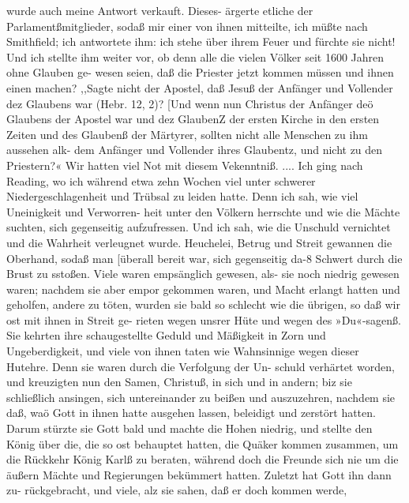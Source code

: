 wurde auch meine Antwort verkauft. Dieses- ärgerte etliche der
Parlamentßmitglieder, sodaß mir einer von ihnen mitteilte, ich
müßte nach Smithfield; ich antwortete ihm: ich stehe über ihrem
Feuer und fürchte sie nicht! Und ich stellte ihm weiter vor, ob
denn alle die vielen Völker seit 1600 Jahren ohne Glauben ge-
wesen seien, daß die Priester jetzt kommen müssen und ihnen einen
machen? ,,Sagte nicht der Apostel, daß Jesuß der Anfänger und
Vollender dez Glaubens war (Hebr. 12, 2)? [Und wenn nun
Christus der Anfänger deö Glaubens der Apostel war und dez
GlaubenZ der ersten Kirche in den ersten Zeiten und des Glaubenß
der Märtyrer, sollten nicht alle Menschen zu ihm aussehen alk-
dem Anfänger und Vollender ihres Glaubentz, und nicht zu den
Priestern?« Wir hatten viel Not mit diesem Vekenntniß. ....
Ich ging nach Reading, wo ich während etwa zehn Wochen
viel unter schwerer Niedergeschlagenheit und Trübsal zu leiden
hatte. Denn ich sah, wie viel Uneinigkeit und Verworren-
heit unter den Völkern herrschte und wie die Mächte suchten, sich
gegenseitig aufzufressen. Und ich sah, wie die Unschuld vernichtet
und die Wahrheit verleugnet wurde. Heuchelei, Betrug und
Streit gewannen die Oberhand, sodaß man [überall bereit war,
sich gegenseitig da-8 Schwert durch die Brust zu sstoßen. Viele
waren empsänglich gewesen, als- sie noch niedrig gewesen waren;
nachdem sie aber empor gekommen waren, und Macht erlangt
hatten und geholfen, andere zu töten, wurden sie bald so
schlecht wie die übrigen, so daß wir ost mit ihnen in Streit ge-
rieten wegen unsrer Hüte und wegen des »Du«-sagenß. Sie
kehrten ihre schaugestellte Geduld und Mäßigkeit in Zorn und
Ungeberdigkeit, und viele von ihnen taten wie Wahnsinnige wegen
dieser Hutehre. Denn sie waren durch die Verfolgung der Un-
schuld verhärtet worden, und kreuzigten nun den Samen,
Christuß, in sich und in andern; biz sie schließlich ansingen, sich
untereinander zu beißen und auszuzehren, nachdem sie daß, waö
Gott in ihnen hatte ausgehen lassen, beleidigt und zerstört hatten.
Darum stürzte sie Gott bald und machte die Hohen niedrig, und
stellte den König über die, die so ost behauptet hatten, die Quäker
kommen zusammen, um die Rückkehr König Karlß zu beraten,
während doch die Freunde sich nie um die äußern Mächte und
Regierungen bekümmert hatten. Zuletzt hat Gott ihn dann zu-
rückgebracht, und viele, alz sie sahen, daß er doch kommen werde,


